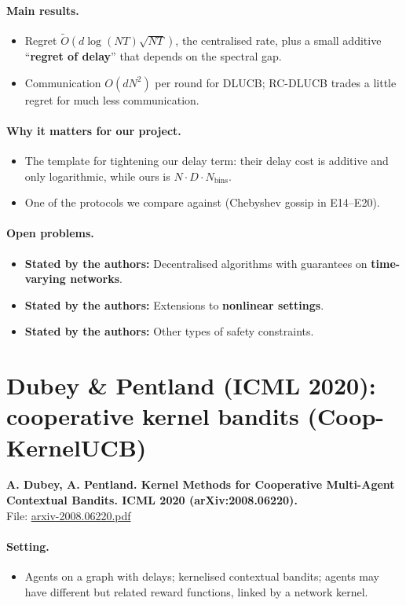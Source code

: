 \documentclass[11pt]{article}
\newcommand{\stated}{\textcolor{green!40!black}{\textbf{Stated by the authors:}}}
\newcommand{\file}[1]{\url{#1}}
\begin{document}
\paragraph{Main results.}
\begin{itemize}\item Regret $\tilde O(d\log(NT)\sqrt{NT})$, the centralised rate, plus a small additive ``\textbf{regret of delay}'' that depends on the spectral gap.\item Communication $O(dN^2)$ per round for DLUCB; RC-DLUCB trades a little regret for much less communication.\end{itemize}
\paragraph{Why it matters for our project.}
\begin{itemize}\item The template for tightening our delay term: their delay cost is additive and only logarithmic, while ours is $N\cdot D\cdot N_{\mathrm{bins}}$.\item One of the protocols we compare against (Chebyshev gossip in E14--E20).\end{itemize}
\paragraph{Open problems.}
\begin{itemize}\item \stated{} Decentralised algorithms with guarantees on \textbf{time-varying networks}.\item \stated{} Extensions to \textbf{nonlinear settings}.\item \stated{} Other types of safety constraints.\end{itemize}
\section{Dubey \& Pentland (ICML 2020): cooperative kernel bandits (Coop-KernelUCB)}
\textbf{A. Dubey, A. Pentland. Kernel Methods for Cooperative Multi-Agent Contextual Bandits. ICML 2020 (arXiv:2008.06220).}\\ File: \file{arxiv-2008.06220.pdf}
\paragraph{Setting.}
\begin{itemize}\item Agents on a graph with delays; kernelised contextual bandits; agents may have different but related reward functions, linked by a network kernel.\end{itemize}
\end{document}
